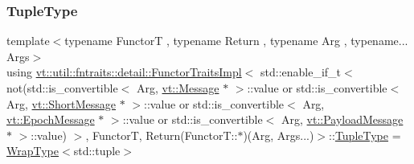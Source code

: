 \subsubsection{\texorpdfstring{Tuple\+Type}{TupleType}}
{\footnotesize\ttfamily template$<$typename FunctorT , typename Return , typename Arg , typename... Args$>$ \\
using \hyperlink{structvt_1_1util_1_1fntraits_1_1detail_1_1_functor_traits_impl}{vt\+::util\+::fntraits\+::detail\+::\+Functor\+Traits\+Impl}$<$ std\+::enable\+\_\+if\+\_\+t$<$ not(std\+::is\+\_\+convertible$<$ Arg, \hyperlink{namespacevt_a3a3ddfef40b4c90915fa43cdd5f129ea}{vt\+::\+Message} $\ast$ $>$\+::value or std\+::is\+\_\+convertible$<$ Arg, \hyperlink{namespacevt_a1125ac1da6c0bbf141e0ea0739d7602d}{vt\+::\+Short\+Message} $\ast$ $>$\+::value or std\+::is\+\_\+convertible$<$ Arg, \hyperlink{namespacevt_ad67368ffae52d7325002586b41bb150e}{vt\+::\+Epoch\+Message} $\ast$ $>$\+::value or std\+::is\+\_\+convertible$<$ Arg, \hyperlink{namespacevt_a89a92229c5622b855c02c549f83a1a68}{vt\+::\+Payload\+Message} $\ast$ $>$\+::value) $>$, FunctorT, Return(Functor\+T\+::$\ast$)(Arg, Args...)$>$\+::\hyperlink{structvt_1_1util_1_1fntraits_1_1detail_1_1_functor_traits_impl_3_01std_1_1enable__if__t_3_01not_ff7bf429a58012799da4cee5038d568d_ae99e25bb3ddd6fc8a8a132e79ee61439}{Tuple\+Type} =  \hyperlink{structvt_1_1util_1_1fntraits_1_1detail_1_1_functor_traits_impl_3_01std_1_1enable__if__t_3_01not_ff7bf429a58012799da4cee5038d568d_af568c800c3dc13d04dce33d8fe8886ba}{Wrap\+Type}$<$std\+::tuple$>$}

